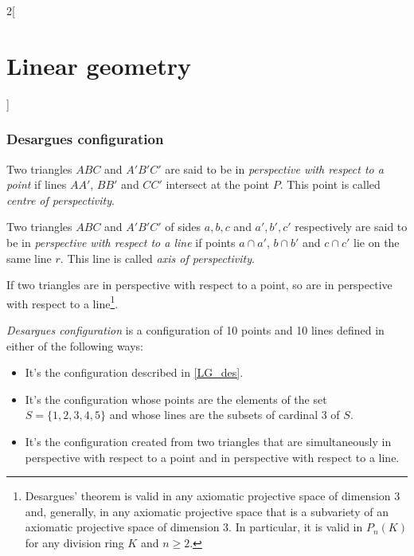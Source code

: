 \documentclass[../../../main.tex]{subfiles}
\begin{document}
\begin{multicols}{2}[\section{Linear geometry}]
  \subsubsection{Desargues configuration}
  \begin{definition}
    Two triangles $ABC$ and $A'B'C'$ are said to be in \textit{perspective with respect to a point} if lines $AA'$, $BB'$ and $CC'$ intersect at the point $P$. This point is called \textit{centre of perspectivity}.
  \end{definition}
  \begin{definition}
    Two triangles $ABC$ and $A'B'C'$ of sides $a,b,c$ and $a',b',c'$ respectively are said to be in \textit{perspective with respect to a line} if points $a\cap a'$, $b\cap b'$ and $c\cap c'$ lie on the same line $r$. This line is called \textit{axis of perspectivity}.
  \end{definition}
  \begin{theorem}
    If two triangles are in perspective with respect to a point, so are in perspective with respect to a line\footnote{Desargues' theorem is valid in any axiomatic projective space of dimension 3 and, generally, in any axiomatic projective space that is a subvariety of an axiomatic projective space of dimension 3. In particular, it is valid in $P_n(K)$ for any division ring $K$ and $n\geq2$.}.
  \end{theorem}
  \begin{definition}
    \textit{Desargues configuration} is a configuration of 10 points and 10 lines defined in either of the following ways:
    \begin{itemize}
      \item It's the configuration described in \cref{LG_des}.
            \begin{center}
              \begin{minipage}{\linewidth}
                \centering
                
                \label{LG_des}
              \end{minipage}
            \end{center}
      \item It's the configuration whose points are the elements of the set $S=\{1,2,3,4,5\}$ and whose lines are the subsets of cardinal 3 of $S$.
      \item It's the configuration created from two triangles that are simultaneously in perspective with respect to a point and in perspective with respect to a line.

\end{itemize}
\end{definition}
\end{multicols}
\end{document}
